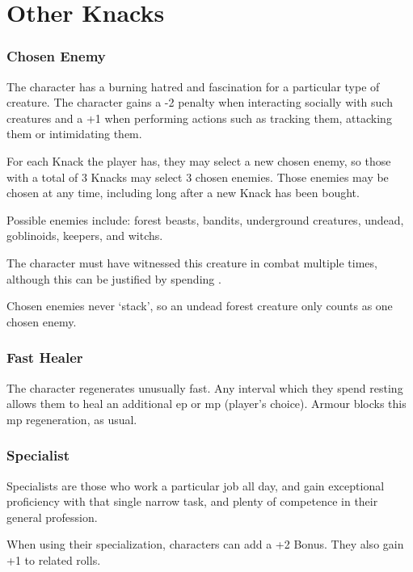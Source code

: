 \section{Other Knacks}

\begin{multicols}{2}

\subsubsection{Chosen Enemy}

The character has a burning hatred and fascination for a particular type of creature.
The character gains a -2 penalty when interacting socially with such creatures and a +1 when performing actions such as tracking them, attacking them or intimidating them.

For each Knack the player has, they may select a new chosen enemy, so those with a total of 3 Knacks may select 3 chosen enemies. Those enemies may be chosen at any time, including long after a new Knack has been bought.

Possible enemies include: forest beasts, bandits, underground creatures, undead, goblinoids, \glspl{keeper}, and \glspl{witch}.

The character must have witnessed this creature in combat multiple times, although this can be justified by spending .%

Chosen enemies never `stack', so an undead forest creature only counts as one chosen enemy.

\subsubsection{Fast Healer}

The character regenerates unusually fast.
Any \gls{interval} which they spend resting allows them to heal an additional \gls{ep} or \gls{mp} (player's choice).
Armour blocks this \gls{mp} regeneration, as usual.

\subsubsection{Specialist}
\label{specialist}

Specialists are those who work a particular job all day, and gain exceptional proficiency with that single narrow task, and plenty of competence in their general profession.

When using their specialization, characters can add a +2 Bonus.
They also gain +1 to related rolls.


\end{multicols}
